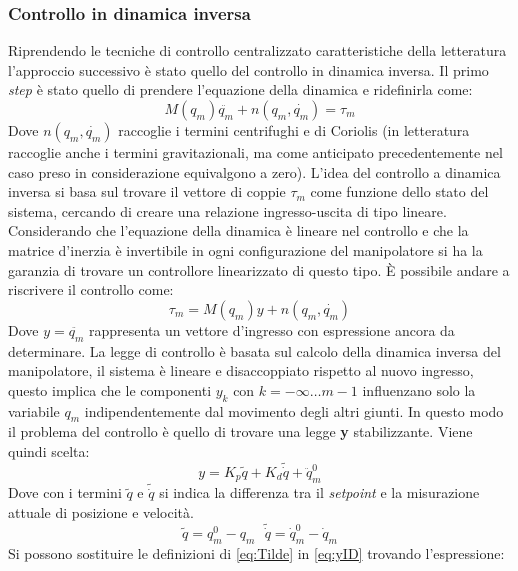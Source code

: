 \subsubsection{Controllo in dinamica inversa}
Riprendendo le tecniche di controllo centralizzato caratteristiche della letteratura l'approccio successivo è stato quello del controllo in dinamica inversa. Il primo \textit{step} è stato quello di prendere l'equazione della dinamica e ridefinirla come: 
\begin{equation}
M(q_m)\ddot{q_m} + n(q_m,\dot{q_m}) = \tau_m
\label{eq:ControlloreID}
\end{equation}
Dove $n(q_m,\dot{q_m})$ raccoglie i termini centrifughi e di Coriolis (in letteratura raccoglie anche i termini gravitazionali, ma come anticipato precedentemente nel caso preso in considerazione equivalgono a zero). L'idea del controllo a dinamica inversa si basa sul trovare il vettore di coppie $\tau_m$ come funzione dello stato del sistema, cercando di creare una relazione ingresso-uscita di tipo lineare. Considerando che l'equazione della dinamica è lineare nel controllo e che la matrice d'inerzia è invertibile in ogni configurazione del manipolatore si ha la garanzia di trovare un controllore linearizzato di questo tipo. È possibile andare a riscrivere il controllo come:
\begin{equation}
\tau_m = M(q_m)y + n(q_m,\dot{q_m})
\end{equation}
Dove $y = \ddot{q_m}$ rappresenta un vettore d'ingresso con espressione ancora da determinare. La legge di controllo è basata sul calcolo della dinamica inversa del manipolatore, il sistema è lineare e disaccoppiato rispetto al nuovo ingresso, questo implica che le componenti $y_k$ con $k = -\infty \dots m-1$ influenzano solo la variabile $q_m$ indipendentemente dal movimento degli altri giunti. In questo modo il problema del controllo è quello di trovare una legge \textbf{y} stabilizzante. Viene quindi scelta:
\begin{equation}
y = K_p\tilde{q} + K_d\tilde{\dot{q}}+\ddot{q}_m^0
\label{eq:yID}
\end{equation}
Dove con i termini $\tilde{q}$ e $\tilde{\dot{q}}$ si indica la differenza tra il \textit{setpoint} e la misurazione attuale di posizione e velocità. 
\begin{equation}
\tilde{q} = q^0_m - q_m \ \ \  \tilde{\dot{q}}= \dot{q}^0_m-\dot{q}_m
\label{eq:Tilde}
\end{equation}
Si possono sostituire le definizioni di \ref{eq:Tilde} in \ref{eq:yID} trovando l'espressione:
